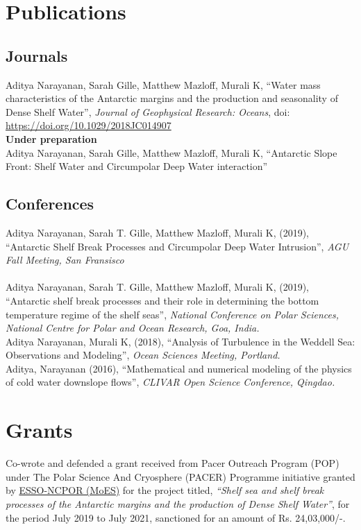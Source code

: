 \documentclass[10pt, a4paper]{article}
\newcommand{\years}[1]{\marginnote{\scriptsize #1}}
\begin{document}
\section*{Publications}

\subsection*{\bf Journals}
\years{2019}Aditya Narayanan, Sarah Gille, Matthew Mazloff, Murali K, ``Water mass characteristics of the Antarctic margins and the production and seasonality of Dense Shelf Water'', \emph{Journal of Geophysical Research: Oceans}, doi: \url{https://doi.org/10.1029/2018JC014907}\\

{\bf Under preparation}\\

\years{}Aditya Narayanan, Sarah Gille, Matthew Mazloff, Murali K, ``Antarctic Slope Front: Shelf Water and Circumpolar Deep Water interaction''\\


\subsection*{\bf Conferences}
\years{2019}Aditya Narayanan, Sarah T. Gille, Matthew Mazloff, Murali K, (2019), ``Antarctic Shelf Break Processes and Circumpolar Deep Water Intrusion'', \emph{AGU Fall Meeting, San Fransisco}\\
\\

\years{2019}Aditya Narayanan, Sarah T. Gille, Matthew Mazloff, Murali K, (2019), ``Antarctic shelf break processes and their role in determining the bottom temperature regime of the shelf seas'', \emph{National Conference on Polar Sciences, National Centre for Polar and Ocean Research, Goa, India.}\\

\years{2018}Aditya Narayanan, Murali K, (2018), ``Analysis of Turbulence in the Weddell Sea: Observations and Modeling'', \emph{Ocean Sciences Meeting, Portland.}\\

\years{2016}Aditya, Narayanan (2016), ``Mathematical and numerical modeling of the physics of cold water downslope flows'', \emph{CLIVAR Open Science Conference, Qingdao.}


\section*{Grants}
\years{2019--2021} Co-wrote and defended a grant received from Pacer Outreach Program (POP) under The Polar Science And Cryosphere (PACER) Programme initiative granted by \href{http://ncaor.gov.in/}{ESSO-NCPOR (MoES)} for the project titled, \emph{``Shelf sea and shelf break processes of the Antarctic margins and the production of Dense Shelf Water''}, for the period July 2019 to July 2021, sanctioned for an amount of Rs. 24,03,000/-.\\
\end{document}
